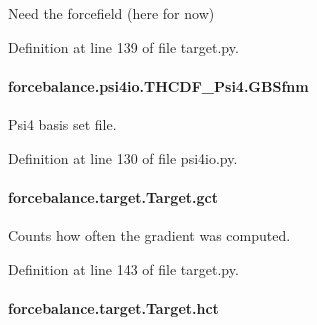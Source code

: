 Need the forcefield (here for now) 



Definition at line 139 of file target.\-py.

\hypertarget{classforcebalance_1_1psi4io_1_1THCDF__Psi4_ab406b703826e225ec1e1bb174faf0537}{
\paragraph[{G\-B\-Sfnm}]{\setlength{\rightskip}{0pt plus 5cm}forcebalance.\-psi4io.\-T\-H\-C\-D\-F\-\_\-\-Psi4.\-G\-B\-Sfnm}}\label{classforcebalance_1_1psi4io_1_1THCDF__Psi4_ab406b703826e225ec1e1bb174faf0537}


Psi4 basis set file. 



Definition at line 130 of file psi4io.\-py.

\hypertarget{classforcebalance_1_1target_1_1Target_aa625ac88c6744eb14ef281d9496d0dbb}{
\paragraph[{gct}]{\setlength{\rightskip}{0pt plus 5cm}forcebalance.\-target.\-Target.\-gct\hspace{0.3cm}{\ttfamily [inherited]}}}\label{classforcebalance_1_1target_1_1Target_aa625ac88c6744eb14ef281d9496d0dbb}


Counts how often the gradient was computed. 



Definition at line 143 of file target.\-py.

\hypertarget{classforcebalance_1_1target_1_1Target_a5b5a42f78052b47f29ed4b940c6111a1}{
\paragraph[{hct}]{\setlength{\rightskip}{0pt plus 5cm}forcebalance.\-target.\-Target.\-hct\hspace{0.3cm}{\ttfamily [inherited]}}}\label{classforcebalance_1_1target_1_1Target_a5b5a42f78052b47f29ed4b940c6111a1}


